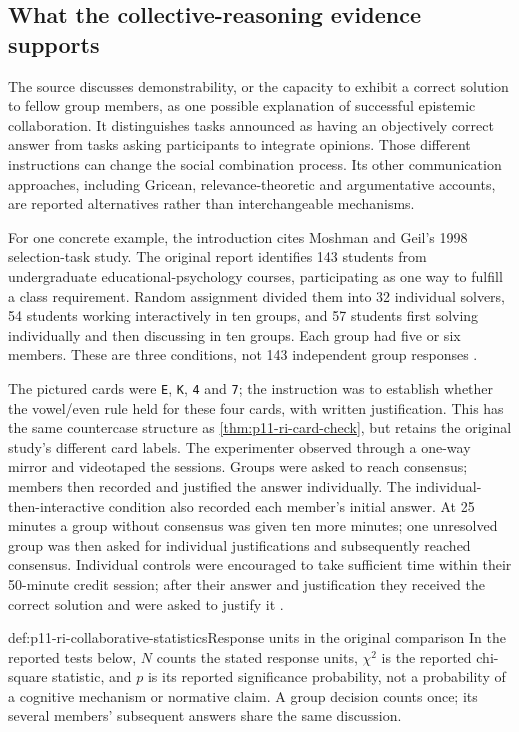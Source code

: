 \subsection{What the collective-reasoning evidence supports}

The source discusses demonstrability, or the capacity to exhibit a
correct solution to fellow group members, as one possible explanation
of successful epistemic collaboration. It distinguishes tasks announced
as having an objectively correct answer from tasks asking participants
to integrate opinions. Those different instructions can change the
social combination process. Its other communication approaches,
including Gricean, relevance-theoretic and argumentative accounts, are
reported alternatives rather than interchangeable mechanisms.

For one concrete example, the introduction cites Moshman and Geil's
1998 selection-task study. The original report identifies 143 students
from undergraduate educational-psychology courses, participating as one
way to fulfill a class requirement. Random assignment divided them into
32 individual solvers, 54 students working interactively in ten groups,
and 57 students first solving individually and then discussing in ten
groups. Each group had five or six members. These are three conditions,
not 143 independent group responses
\cite[pp.~233--234]{MoshmanGeil1998CollaborativeReasoning}.

The pictured cards were \texttt{E}, \texttt{K}, \texttt{4} and
\texttt{7}; the instruction was to establish whether the vowel/even
rule held for these four cards, with written justification. This has the
same countercase structure as \cref{thm:p11-ri-card-check}, but retains
the original study's different card labels. The experimenter observed
through a one-way mirror and videotaped the sessions. Groups were asked
to reach consensus; members then recorded and justified the answer
individually. The individual-then-interactive condition also recorded
each member's initial answer. At 25 minutes a group without consensus
was given ten more minutes; one unresolved group was then asked for
individual justifications and subsequently reached consensus. Individual
controls were encouraged to take sufficient time within their 50-minute
credit session; after their answer and justification they received the
correct solution and were asked to justify it
\cite[p.~234]{MoshmanGeil1998CollaborativeReasoning}.

\begin{hbconvention}{def:p11-ri-collaborative-statistics}{Response units in the original comparison}
In the reported tests below, \(N\) counts the stated response units,
\(\chi^2\) is the reported chi-square statistic, and \(p\) is its
reported significance probability, not a probability of a cognitive
mechanism or normative claim. A group decision counts once; its several
members' subsequent answers share the same discussion.
\end{hbconvention}


